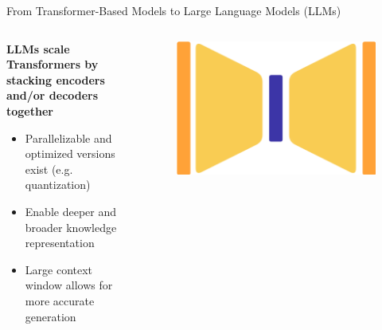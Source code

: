 \documentclass[11pt,aspectratio=169]{beamer}
\begin{document}
\begin{frame}{From Transformer-Based Models to Large Language Models (LLMs)}

\begin{columns}
    \begin{column}{0.7\linewidth}
        \vspace{-0.2cm}
        \begin{center}
        \textbf{LLMs scale Transformers by stacking encoders and/or decoders together}
        \end{center}
        \vspace{0.1cm}
        \begin{itemize}
            \item Parallelizable and optimized versions exist (e.g. quantization)
            \item Enable deeper and broader knowledge representation
            \item Large context window allows for more accurate generation
        \end{itemize}
        \vspace{0.3cm}
    \end{column}
    \begin{column}{0.3\linewidth}
        \begin{figure}
            \includegraphics[width=0.45\linewidth]{ed_encoder_decoder.png}

\end{figure}
\end{column}
\end{columns}
\end{frame}
\end{document}
